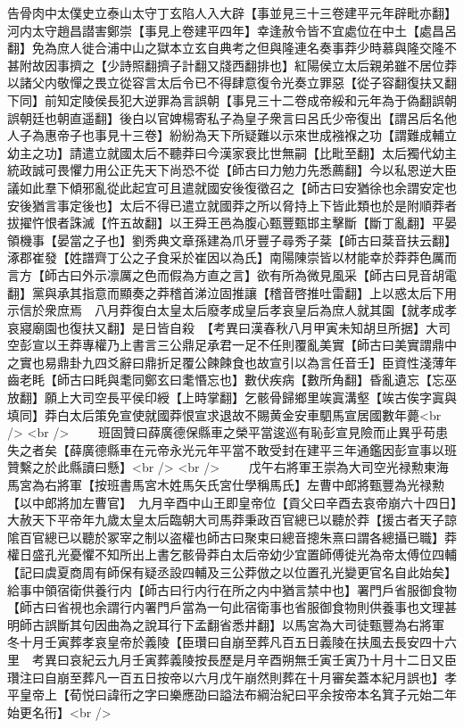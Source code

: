告骨肉中太僕史立泰山太守丁玄陷人入大辟【事並見三十三卷建平元年辟毗亦翻】河内太守趙昌譛害鄭崇【事見上卷建平四年】幸逢赦令皆不宜處位在中土【處昌呂翻】免為庶人徙合浦中山之獄本立玄自典考之但與隆連名奏事莽少時慕與隆交隆不甚附故因事擠之【少詩照翻擠子計翻又牋西翻排也】紅陽侯立太后親弟雖不居位莽以諸父内敬憚之畏立從容言太后令已不得肆意復令光奏立罪惡【從子容翻復扶又翻下同】前知定陵侯長犯大逆罪為言誤朝【事見三十二卷成帝綏和元年為于偽翻誤朝誤朝廷也朝直遥翻】後白以官婢楊寄私子為皇子衆言曰呂氏少帝復出【謂呂后名他人子為惠帝子也事見十三卷】紛紛為天下所疑難以示來世成襁褓之功【謂難成輔立幼主之功】請遣立就國太后不聽莽曰今漢家衰比世無嗣【比毗至翻】太后獨代幼主統政誠可畏懼力用公正先天下尚恐不從【師古曰力勉力先悉薦翻】今以私恩逆大臣議如此羣下傾邪亂從此起宜可且遣就國安後復徵召之【師古曰安猶徐也余謂安定也安後猶言事定後也】太后不得已遣立就國莽之所以脅持上下皆此類也於是附順莽者拔擢忤恨者誅滅【忤五故翻】以王舜王邑為腹心甄豐甄邯主擊斷【斷丁亂翻】平晏領機事【晏當之子也】劉秀典文章孫建為爪牙豐子尋秀子棻【師古曰棻音扶云翻】涿郡崔發【姓譜齊丁公之子食采於崔因以為氏】南陽陳崇皆以材能幸於莽莽色厲而言方【師古曰外示凛厲之色而假為方直之言】欲有所為微見風采【師古曰見音胡電翻】黨與承其指意而顯奏之莽稽首涕泣固推讓【稽音啓推吐雷翻】上以惑太后下用示信於衆庶焉　八月莽復白太皇太后廢孝成皇后孝哀皇后為庶人就其園【就孝成孝哀寢廟園也復扶又翻】是日皆自殺　【考異曰漢春秋八月甲寅未知胡旦所据】大司空彭宣以王莽專權乃上書言三公鼎足承君一足不任則覆亂美實【師古曰美實謂鼎中之實也易鼎卦九四爻辭曰鼎折足覆公餗餗食也故宣引以為言任音壬】臣資性淺薄年齒老眊【師古曰眊與耄同鄭玄曰耄惽忘也】數伏疾病【數所角翻】昏亂遺忘【忘巫放翻】願上大司空長平侯印綬【上時掌翻】乞骸骨歸鄉里竢寘溝壑【竢古俟字寘與填同】莽白太后策免宣使就國莽恨宣求退故不賜黄金安車駟馬宣居國數年薨<br />
<br />
　　班固贊曰薛廣德保縣車之榮平當逡巡有恥彭宣見險而止異乎苟患失之者矣【薛廣德縣車在元帝永光元年平當不敢受封在建平三年通鑑因彭宣事以班贊繫之於此縣讀曰懸】<br />
<br />
　　戊午右將軍王崇為大司空光禄勲東海馬宮為右將軍【按班書馬宮木姓馬矢氏宮仕學稱馬氏】左曹中郎將甄豐為光禄勲【以中郎將加左曹官】　九月辛酉中山王即皇帝位【貢父曰辛酉去哀帝崩六十四日】大赦天下平帝年九歲太皇太后臨朝大司馬莽秉政百官總已以聽於莽【援古者天子諒隂百官總已以聽於冢宰之制以盗權也師古曰聚束曰總音摠朱熹曰謂各總攝已職】莽權日盛孔光憂懼不知所出上書乞骸骨莽白太后帝幼少宜置師傅徙光為帝太傅位四輔【記曰虞夏商周有師保有疑丞設四輔及三公莽倣之以位置孔光變更官名自此始矣】給事中領宿衛供養行内【師古曰行内行在所之内中猶言禁中也】署門戶省服御食物【師古曰省視也余謂行内署門戶當為一句此宿衛事也省服御食物則供養事也文理甚明師古誤斷其句因曲為之說耳行下孟翻省悉井翻】以馬宮為大司徒甄豐為右將軍　冬十月壬寅葬孝哀皇帝於義陵【臣瓚曰自崩至葬凡百五日義陵在扶風去長安四十六里　考異曰哀紀云九月壬寅葬義陵按長歷是月辛酉朔無壬寅壬寅乃十月十二日又臣瓚注曰自崩至葬凡一百五日按帝以六月戊午崩然則葬在十月審矣蓋本紀月誤也】孝平皇帝上【荀悦曰諱衎之字曰樂應劭曰謚法布綱治紀曰平余按帝本名箕子元始二年始更名衎】<br />
